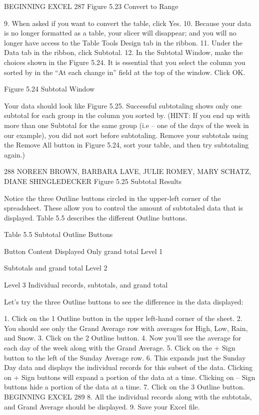BEGINNING EXCEL 287
Figure 5.23 Convert to Range

9. When asked if you want to convert the table, click Yes.
10. Because your data is no longer formatted as a table, your slicer will disappear; and you will no
longer have access to the Table Tools Design tab in the ribbon.
11. Under the Data tab in the ribbon, click Subtotal.
12. In the Subtotal Window, make the choices shown in the Figure 5.24. It is essential that you select
the column you sorted by in the “At each change in” field at the top of the window. Click OK.




Figure 5.24 Subtotal Window


Your data should look like Figure 5.25. Successful subtotaling shows only one subtotal for each group
in the column you sorted by. (HINT: If you end up with more than one Subtotal for the same group
(i.e – one of the days of the week in our example), you did not sort before subtotaling. Remove your
subtotals using the Remove All button in Figure 5.24, sort your table, and then try subtotaling again.)




288 NOREEN BROWN, BARBARA LAVE, JULIE ROMEY, MARY SCHATZ, DIANE SHINGLEDECKER
Figure 5.25 Subtotal Results


Notice the three Outline buttons circled in the upper-left corner of the spreadsheet. These allow you
to control the amount of subtotaled data that is displayed. Table 5.5 describes the different Outline
buttons.

Table 5.5 Subtotal Outline Buttons

Button Content Displayed
Only grand total
Level 1


Subtotals and grand total
Level 2


Level 3 Individual records, subtotals, and grand total


Let’s try the three Outline buttons to see the difference in the data displayed:

1. Click on the 1 Outline button in the upper left-hand corner of the sheet.
2. You should see only the Grand Average row with averages for High, Low, Rain, and Snow.
3. Click on the 2 Outline button.
4. Now you’ll see the average for each day of the week along with the Grand Average.
5. Click on the + Sign button to the left of the Sunday Average row.
6. This expands just the Sunday Day data and displays the individual records for this subset of the
data. Clicking on + Sign buttons will expand a portion of the data at a time. Clicking on – Sign
buttons hide a portion of the data at a time.
7. Click on the 3 Outline button.
BEGINNING EXCEL 289
8. All the individual records along with the subtotals, and Grand Average should be displayed.
9. Save your Excel file.



